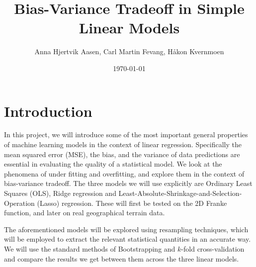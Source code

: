 \documentclass[twocolumn,english,notitlepage]{article}
\title{Bias-Variance Tradeoff in Simple Linear Models}
\author{Anna Hjertvik Aasen, Carl Martin Fevang, Håkon Kvernmoen}
\date{\today}
\begin{document}


\section{Introduction}
    In this project, we will introduce some of the most important general properties of machine learning models in the context of linear regression. Specifically the mean squared error (MSE), the bias, and the variance of data predictions are essential in evaluating the quality of a statistical model. We look at the phenomena of under fitting and overfitting, and explore them in the context of bias-variance tradeoff. The three models we will use explicitly are Ordinary Least Squares (OLS), Ridge regression and Least-Absolute-Shrinkage-and-Selection-Operation (Lasso) regression. These will first be tested on the 2D Franke function, and later on real geographical terrain data.

    The aforementioned models will be explored using resampling techniques, which will be employed to extract the relevant statistical quantities in an accurate way. We will use the standard methods of Bootstrapping and $k$-fold cross-validation and compare the results we get between them across the three linear models.
\end{document}
